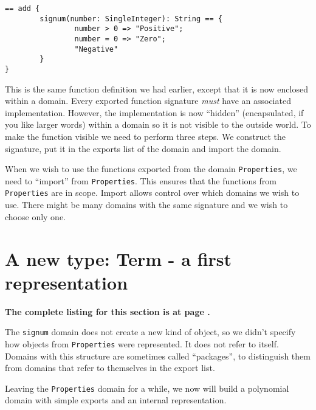 \begin{small}
\begin{verbatim}
== add {
        signum(number: SingleInteger): String == {
                number > 0 => "Positive";
                number = 0 => "Zero";
                "Negative"
        }
}
\end{verbatim}
\end{small}

This is the same function definition we had earlier, except that it is
now enclosed within a domain. Every exported function signature {\em
must\/} have an associated implementation. However, the implementation is now 
``hidden'' (encapsulated, if you like larger words) within a domain 
so it is not visible to the outside world. To make the function visible we 
need to perform three steps. We construct the signature, put it
in the exports list of the domain and import the domain.

When we wish to use the functions exported from the domain
\verb"Properties", we need to ``import'' from \verb"Properties". This ensures
that the functions from \verb"Properties" are in scope. Import allows
control over which domains we wish to use. There might be 
many domains with the same signature and we wish to choose only one.

%


\section{A new type: Term - a first representation}

{\bf The complete listing for this section is at page \pageref{FirstTermRepListing}.}

The \verb"signum" domain does not create a new kind
of object, so we didn't specify how objects from
\verb"Properties" were represented. It does not refer
to itself. Domains with this structure are sometimes called
``packages'',
to distinguish them from domains that refer to themselves in the
export list.

Leaving the \verb"Properties" domain for a while, we now will build a polynomial
domain with simple exports and an internal representation.

